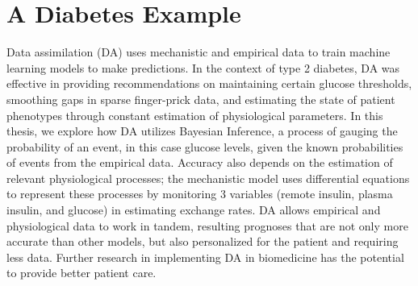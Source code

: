 \section{A Diabetes Example}
\label{A Diabetes Example}

Data assimilation (DA) uses mechanistic and empirical data to train machine learning models to make predictions. In the context of type 2 diabetes, DA was effective in providing recommendations on maintaining certain glucose thresholds, smoothing gaps in sparse finger-prick data, and estimating the state of patient phenotypes through constant estimation of physiological parameters. In this thesis, we explore how DA utilizes Bayesian Inference, a process of gauging the probability of an event, in this case glucose levels, given the known probabilities of events from the empirical data. Accuracy also depends on the estimation of relevant physiological processes; the mechanistic model uses differential equations to represent these processes by monitoring 3 variables (remote insulin, plasma insulin, and glucose) in estimating exchange rates. DA allows empirical and physiological data to work in tandem, resulting prognoses that are not only more accurate than other models, but also personalized for the patient and requiring less data. Further research in implementing DA in biomedicine has the potential to provide better patient care.
